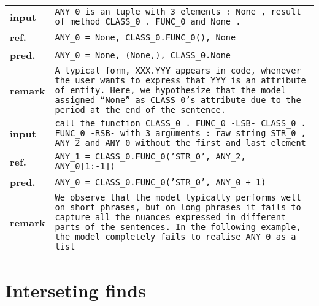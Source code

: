\documentclass{article}
\begin{document}
  \begin{tabular}{ l p{}}
    \hline
		\textbf{input} & \texttt{ANY\_0 is an tuple with 3 elements : None , result of method 
                     CLASS\_0 . FUNC\_0 and None .} \\
    \textbf{ref.}  & \texttt{ANY\_0 = None, CLASS\_0.FUNC\_0(), None} \\
    \textbf{pred.} & \texttt{ANY\_0 = None, (None,), CLASS\_0.None} \\
    \textbf{remark}& \texttt{A typical form, XXX.YYY appears in code, whenever the user wants to 
                     express that YYY is an attribute of entity. Here, we hypothesize that the 
                     model assigned ``None'' as CLASS\_0's attribute due to the period at the end 
                     of the sentence.} \\
    \hline
		\textbf{input} & \texttt{call the function CLASS\_0 . FUNC\_0 -LSB- CLASS\_0 . FUNC\_0 -RSB- 
                     with 3 arguments : raw string STR\_0 , ANY\_2 and ANY\_0 without the first 
                     and last element} \\
    \textbf{ref.}  & \texttt{ANY\_1 = CLASS\_0.FUNC\_0('STR\_0', ANY\_2, ANY\_0[1:-1])} \\
    \textbf{pred.} & \texttt{ANY\_0 = CLASS\_0.FUNC\_0('STR\_0', ANY\_0 + 1)} \\ 
    \textbf{remark}& \texttt{We observe that the model typically performs well on short phrases, 
                     but on long phrases it fails to capture all the nuances expressed in 
                     different parts of the sentences. In the following example, the model 
                     completely fails to realise ANY\_0 as a list} \\
    \hline
  \end{tabular}

  \section{Interseting finds}
\end{document}
